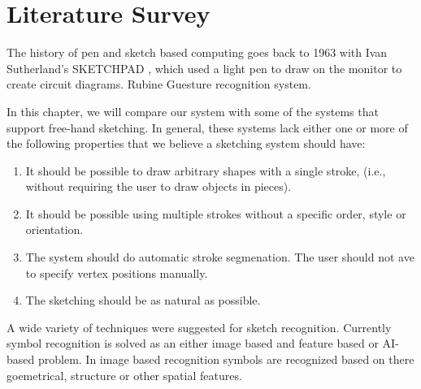 \chapter{Literature Survey}


The history of pen and sketch based computing goes back to 1963 with Ivan Sutherland's SKETCHPAD \cite{}, which used a light pen to draw on the monitor to create circuit diagrams. Rubine \cite{} Guesture recognition system. 


In this chapter, we will compare our system with some of the systems that support free-hand sketching. In general, these systems lack either one or more of the following properties that we believe a sketching system should have:
\begin{enumerate}
	\item It should be possible to draw arbitrary shapes with a single stroke, (i.e., without requiring the user to draw objects in pieces).
\item It should be possible using multiple strokes without a specific order, style or orientation. 
\item The system should do automatic stroke segmenation. The user should not ave to specify vertex positions manually. 
\item The sketching should be as natural as possible. 
\end{enumerate}
A wide variety of techniques were suggested for sketch recognition. Currently symbol recognition is solved as an either image based and feature based or AI-based problem. In image based recognition symbols are recognized based on there goemetrical, structure or other spatial features. 




